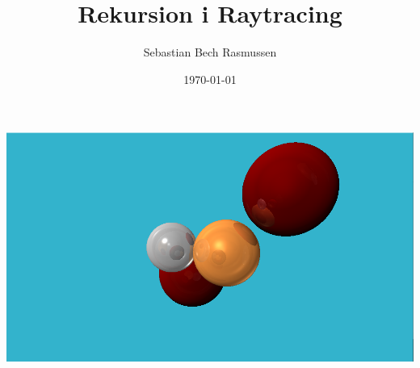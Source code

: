 \documentclass{article}
\title{Rekursion i Raytracing}
\author{Sebastian Bech Rasmussen}
\date{\today}
\begin{document}
\begin{titlepage}
    \maketitle
    \centering
    \includegraphics[scale=0.425]{images/raytracer.png}
\end{titlepage}

\tableofcontents

\newpage
\end{document}
